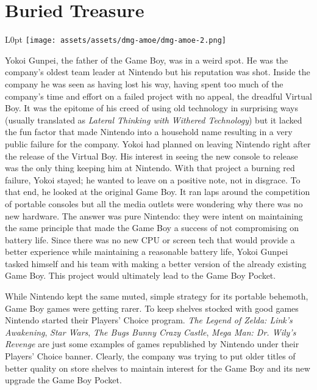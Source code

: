 \documentclass{book}
\begin{document}
\FloatBarrier\needspace{5pt}\section*{Buried Treasure}\nopagebreak[4]
\begin{wrapfigure}{L}{0pt} \texttt{[image: assets/assets/dmg-amoe/dmg-amoe-2.png]}\end{wrapfigure}
Yokoi Gunpei, the father of the Game Boy, was in a weird spot. He was the company’s oldest team leader at Nintendo but his reputation was shot. Inside the company he was seen as having lost his way, having spent too much of the company’s time and effort on a failed project with no appeal, the dreadful Virtual Boy. It was the epitome of his creed of using old technology in surprising ways (usually translated as \emph{Lateral Thinking with Withered Technology}) but it lacked the fun factor that made Nintendo into a household name resulting in a very public failure for the company. Yokoi had planned on leaving Nintendo right after the release of the Virtual Boy. His interest in seeing the new console to release was the only thing keeping him at Nintendo. With that project a burning red failure, Yokoi stayed; he wanted to leave on a positive note, not in disgrace. To that end, he looked at the original Game Boy. It ran laps around the competition of portable consoles but all the media outlets were wondering why there was no new hardware. The answer was pure Nintendo: they were intent on maintaining the same principle that made the Game Boy a success of not compromising on battery life. Since there was no new CPU or screen tech that would provide a better experience while maintaining a reasonable battery life, Yokoi Gunpei tasked himself and his team with making a better version of the already existing Game Boy. This project would ultimately lead to the Game Boy Pocket.

While Nintendo kept the same muted, simple strategy for its portable behemoth, Game Boy games were getting rarer. To keep shelves stocked with good games Nintendo started their Players’ Choice program. \emph{The Legend of Zelda: Link’s Awakening}, \emph{Star Wars}, \emph{The Bugs Bunny Crazy Castle}, \emph{Mega Man: Dr. Wily’s Revenge} are just some examples of games republished by Nintendo under their Players’ Choice banner. Clearly, the company was trying to put older titles of better quality on store shelves to maintain interest for the Game Boy and its new upgrade the Game Boy Pocket.
\end{document}
